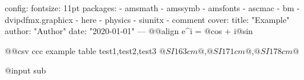 config:
  fontsize: 11pt
  packages:
    - amsmath
    - amssymb
    - amsfonts
    - ascmac
    - bm
    - dvipdfmx.graphicx
    - here
    - physics
    - siunitx
    - comment
cover:
  title: "Example"
  author: "Author"
  date: "2020-01-01"
---
@@align
e^{i\pi} = @cos \pi@ + i@sin 

@@csv ccc
example table
test1,test2,test3
$@SI 163 cm@$,$@SI 171 cm@$,$@SI 178 cm@$

@input sub
